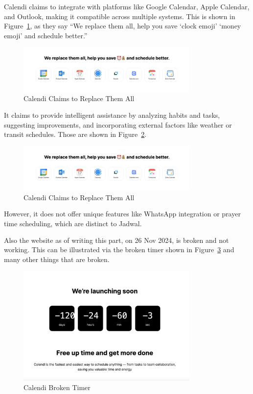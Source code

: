 \documentclass[12pt,a4paper,twoside]{report}
\begin{document}
Calendi claims to integrate with platforms like Google Calendar, Apple Calendar, and Outlook, making it compatible across multiple systems.
This is shown in Figure~\ref{fig:calendi-replace-em}, as they say ``We replace them all, help you save `clock emoji' `money emoji' and schedule better.''

\begin{figure}[!h]
    \centering
    \includegraphics[width=0.8\textwidth]{images/competitors/calendi-replace-em.png}
    \caption{Calendi Claims to Replace Them All}
    \label{fig:calendi-replace-em}
\end{figure}

It claims to provide intelligent assistance by analyzing habits and tasks, suggesting improvements, and incorporating external factors like weather or transit schedules. Those are shown in Figure~\ref{fig:calendi-features}.

\begin{figure}[!h]
    \centering
    \includegraphics[width=0.8\textwidth]{images/competitors/calendi-replace-em.png}
    \caption{Calendi Claims to Replace Them All}
    \label{fig:calendi-features}
\end{figure}

However, it does not offer unique features like WhatsApp integration or prayer time scheduling, which are distinct to Jadwal.

Also the website as of writing this part, on 26 Nov 2024, is broken and not working. This can be illustrated via the broken timer shown in Figure~\ref{fig:calendi-broken-timer} and many other things that are broken.

\begin{figure}[!h]
    \centering
    \includegraphics[width=0.8\textwidth]{images/competitors/calendi-broken-timer.png}
    \caption{Calendi Broken Timer}
    \label{fig:calendi-broken-timer}
\end{figure}
\end{document}
